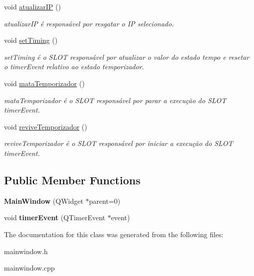\begin{DoxyCompactItemize}
void \mbox{\hyperlink{class_main_window_aa6ee814d80346718dcb56c1b386fcace}{atualizar\+IP}} ()
\begin{DoxyCompactList}\small\item\em atualizar\+IP é responsável por resgatar o IP selecionado. \end{DoxyCompactList}\item 
\mbox{\label{class_main_window_a380872c4aa4095322c798c8ea0ed357e}} 
void \mbox{\hyperlink{class_main_window_a380872c4aa4095322c798c8ea0ed357e}{set\+Timing}} ()
\begin{DoxyCompactList}\small\item\em set\+Timing é o S\+L\+OT responsável por atualizar o valor do estado tempo e resetar o timer\+Event relativo ao estado temporizador. \end{DoxyCompactList}\item 
\mbox{\label{class_main_window_ac4725e6ca6bdfe248d1d5843e44e13f1}} 
void \mbox{\hyperlink{class_main_window_ac4725e6ca6bdfe248d1d5843e44e13f1}{mata\+Temporizador}} ()
\begin{DoxyCompactList}\small\item\em mata\+Temporizador é o S\+L\+OT responsável por parar a execução do S\+L\+OT timer\+Event. \end{DoxyCompactList}\item 
\mbox{\label{class_main_window_ac1e2c1652f678f2e14df2c1d859965c9}} 
void \mbox{\hyperlink{class_main_window_ac1e2c1652f678f2e14df2c1d859965c9}{revive\+Temporizador}} ()
\begin{DoxyCompactList}\small\item\em revive\+Temporizador é o S\+L\+OT responsável por iniciar a execução do S\+L\+OT timer\+Event. \end{DoxyCompactList}\end{DoxyCompactItemize}
\subsection*{Public Member Functions}
\begin{DoxyCompactItemize}
\item 
\mbox{\label{class_main_window_a8b244be8b7b7db1b08de2a2acb9409db}} 
{\bfseries Main\+Window} (Q\+Widget $\ast$parent=0)
\item 
\mbox{\label{class_main_window_aaa425b1554af3c1f58cc70b4815082ae}} 
void {\bfseries timer\+Event} (Q\+Timer\+Event $\ast$event)
\end{DoxyCompactItemize}


The documentation for this class was generated from the following files\+:\begin{DoxyCompactItemize}
\item 
mainwindow.\+h\item 
mainwindow.\+cpp\end{DoxyCompactItemize}
